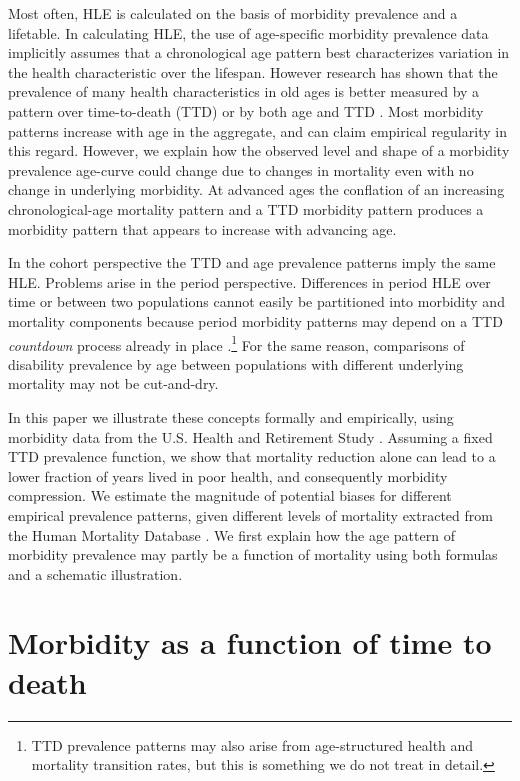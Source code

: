 \documentclass[12pt,oneside,a4paper]{article} %
\begin{document}
Most often, HLE is calculated on the basis of morbidity prevalence and a lifetable. In calculating HLE, the use of age-specific morbidity prevalence data implicitly
assumes that a chronological age pattern best characterizes variation in the
health characteristic over the lifespan. However research has shown that the prevalence of many health characteristics in old ages is better measured by a pattern over time-to-death (TTD) or by both age and TTD \citep{klijs2010disability,riffe2017ttd,rehkopf2016cross}. Most morbidity
patterns increase with age in the aggregate, and can claim empirical regularity
in this regard. However, we explain how the observed level and shape of a morbidity prevalence age-curve
could change due to changes in mortality even with no change in underlying morbidity. At advanced ages the conflation of an increasing chronological-age mortality pattern and a TTD morbidity pattern produces a morbidity pattern that appears to increase with advancing age. 

In the cohort perspective the TTD and age prevalence patterns imply the same HLE.
Problems arise in the period perspective. Differences in period HLE over
time or between two populations cannot easily be partitioned into morbidity and
mortality components because period morbidity patterns may depend on a TTD \emph{countdown} process already in place \citep{wolf2015disability}.\footnote{TTD prevalence patterns may also arise from age-structured health and mortality transition rates, but this is something we do not treat in detail.}
For the same reason, comparisons of disability prevalence by age between populations with different underlying mortality may not be cut-and-dry.

In this paper we illustrate these concepts formally and empirically, using morbidity data from the U.S. Health and Retirement Study \citep{RAND, HRS}. Assuming a fixed TTD prevalence function, we show that mortality reduction alone can lead to a lower fraction of years lived in poor health, and consequently morbidity compression. We estimate the magnitude of potential biases for different empirical prevalence patterns, given different levels of mortality extracted from the Human Mortality Database \citep{HMD2018}. We first explain how the age pattern of morbidity prevalence may partly be a function of mortality using both formulas and a schematic illustration.


\section{Morbidity as a function of time to death}
 \label{sec:morb}
 
\end{document}

